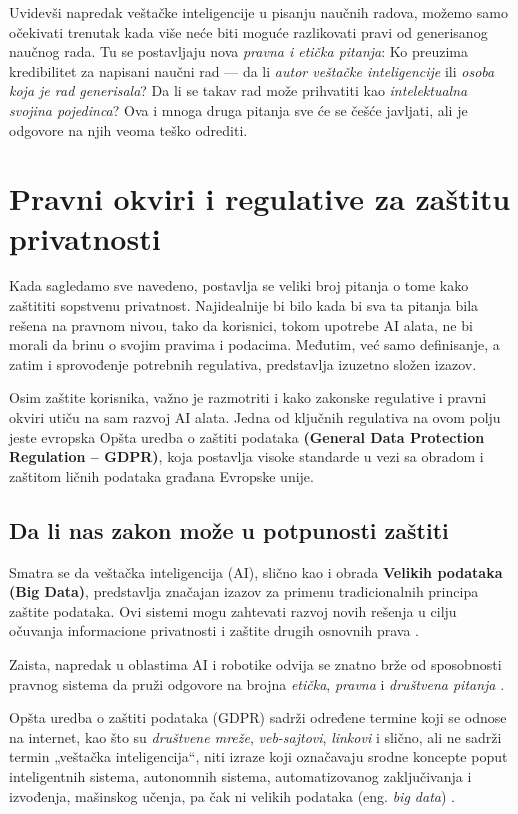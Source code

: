 \documentclass[a4paper,12pt]{article}
\begin{document}
Uvidevši napredak veštačke inteligencije u pisanju naučnih radova, možemo samo očekivati trenutak kada više neće biti moguće razlikovati pravi od generisanog naučnog rada.  
Tu se postavljaju nova \textit{pravna i etička pitanja}:  
Ko preuzima kredibilitet za napisani naučni rad — da li \textit{autor veštačke inteligencije} ili \textit{osoba koja je rad generisala}?  
Da li se takav rad može prihvatiti kao \textit{intelektualna svojina pojedinca}?  
Ova i mnoga druga pitanja sve će se češće javljati, ali je odgovore na njih veoma teško odrediti.

\section{Pravni okviri i regulative za zaštitu privatnosti}

Kada sagledamo sve navedeno, postavlja se veliki broj pitanja o tome kako zaštititi sopstvenu privatnost. Najidealnije bi bilo kada bi sva ta pitanja bila rešena na pravnom nivou, tako da korisnici, tokom upotrebe AI alata, ne bi morali da brinu o svojim pravima i podacima. Međutim, već samo definisanje, a zatim i sprovođenje potrebnih regulativa, predstavlja izuzetno složen izazov.

Osim zaštite korisnika, važno je razmotriti i kako zakonske regulative i pravni okviri utiču na sam razvoj AI alata. Jedna od ključnih regulativa na ovom polju jeste evropska Opšta uredba o zaštiti podataka \textbf{(General Data Protection Regulation – GDPR)}, koja postavlja visoke standarde u vezi sa obradom i zaštitom ličnih podataka građana Evropske unije.

\subsection{Da li nas zakon može u potpunosti zaštiti}

Smatra se da veštačka inteligencija (AI), slično kao i obrada \textbf{Velikih podataka (Big Data)}, predstavlja značajan izazov za primenu tradicionalnih principa zaštite podataka. Ovi sistemi mogu zahtevati razvoj novih rešenja u cilju očuvanja informacione privatnosti i zaštite drugih osnovnih prava \cite{mitrou_gdpr_ai_2018}.

Zaista, napredak u oblastima AI i robotike odvija se znatno brže od sposobnosti pravnog sistema da pruži odgovore na brojna \textit{etička}, \textit{pravna} i \textit{društvena pitanja} \cite{mitrou_gdpr_ai_2018}.


Opšta uredba o zaštiti podataka (GDPR) sadrži određene termine koji se odnose na internet, kao što su \textit{društvene mreže}, \textit{veb-sajtovi}, \textit{linkovi} i slično, ali ne sadrži termin „veštačka inteligencija“, niti izraze koji označavaju srodne koncepte poput inteligentnih sistema, autonomnih sistema, automatizovanog zaključivanja i izvođenja, mašinskog učenja, pa čak ni velikih podataka (eng. \textit{big data}) \cite{sartor_gdpr_ai_2020}.
\end{document}
